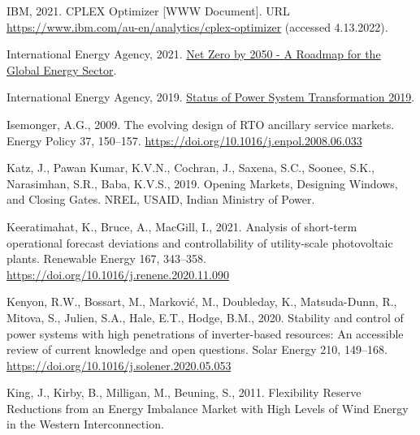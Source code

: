 \documentclass[12pt,a4paper,]{report}
\newlength{\cslhangindent}
\newenvironment{CSLReferences}[2] %
 {%
  \setlength{\parindent}{0pt}
  \ifodd #1 \everypar{\setlength{\hangindent}{\cslhangindent}}\ignorespaces\fi
  \ifnum #2 > 0
  \setlength{\parskip}{#2\baselineskip}
  \fi
 }%
 {}
\begin{document}
\begin{CSLReferences}{1}{0}
\leavevmode{}%
IBM, 2021. {CPLEX Optimizer} {[}WWW Document{]}. URL
\url{https://www.ibm.com/au-en/analytics/cplex-optimizer} (accessed
4.13.2022).

\leavevmode{}%
International Energy Agency, 2021.
\href{https://iea.blob.core.windows.net/assets/deebef5d-0c34-4539-9d0c-10b13d840027/NetZeroby2050-ARoadmapfortheGlobalEnergySector_CORR.pdf}{Net
{Zero} by 2050 - {A Roadmap} for the {Global Energy Sector}}.

\leavevmode{}%
International Energy Agency, 2019.
\href{https://iea.blob.core.windows.net/assets/00dd2818-65f1-426c-8756-9cc0409d89a8/Status_of_Power_System_Transformation_2019.pdf}{Status
of {Power System Transformation} 2019}.

\leavevmode{}%
Isemonger, A.G., 2009. The evolving design of {RTO} ancillary service
markets. Energy Policy 37, 150--157.
\url{https://doi.org/10.1016/j.enpol.2008.06.033}

\leavevmode{}%
Katz, J., Pawan Kumar, K.V.N., Cochran, J., Saxena, S.C., Soonee, S.K.,
Narasimhan, S.R., Baba, K.V.S., 2019. Opening {Markets}, {Designing
Windows}, and {Closing Gates}. {NREL, USAID, Indian Ministry of Power}.

\leavevmode{}%
Keeratimahat, K., Bruce, A., MacGill, I., 2021. Analysis of short-term
operational forecast deviations and controllability of utility-scale
photovoltaic plants. Renewable Energy 167, 343--358.
\url{https://doi.org/10.1016/j.renene.2020.11.090}

\leavevmode{}%
Kenyon, R.W., Bossart, M., Marković, M., Doubleday, K., Matsuda-Dunn,
R., Mitova, S., Julien, S.A., Hale, E.T., Hodge, B.M., 2020. Stability
and control of power systems with high penetrations of inverter-based
resources: {An} accessible review of current knowledge and open
questions. Solar Energy 210, 149--168.
\url{https://doi.org/10.1016/j.solener.2020.05.053}

\leavevmode{}%
King, J., Kirby, B., Milligan, M., Beuning, S., 2011. Flexibility
{Reserve Reductions} from an {Energy Imbalance Market} with {High
Levels} of {Wind Energy} in the {Western Interconnection}.


\end{CSLReferences}
\end{document}
